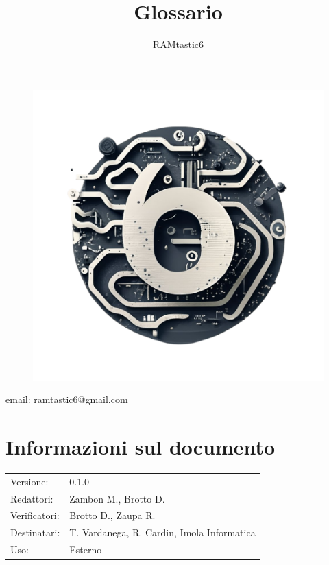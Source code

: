 \documentclass[12pt, oneside]{article}
\author{RAMtastic6}
\begin{document}
\thispagestyle{empty}
\title{Glossario}
\maketitle
\begin{figure}[h]
  \centering
  \includegraphics[scale=0.3]{logo.png}
\end{figure}
\begin{center}
  email: ramtastic6@gmail.com
\end{center}

\section*{Informazioni sul documento}
\begin{tabular}{ll}
  Versione:     & 0.1.0                                      \\
  Redattori:    & Zambon M., Brotto D.                       \\
  Verificatori: & Brotto D., Zaupa R.                        \\
  Destinatari:  & T. Vardanega, R. Cardin, Imola Informatica \\
  Uso:          & Esterno
\end{tabular}
\newpage
\end{document}

